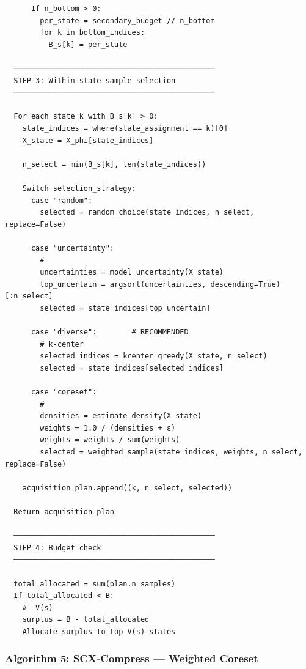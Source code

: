 \documentclass[
  12pt,
]{article}
\begin{document}
\begin{verbatim}
      If n_bottom > 0:
        per_state = secondary_budget // n_bottom
        for k in bottom_indices:
          B_s[k] = per_state

  ──────────────────────────────────────────────
  STEP 3: Within-state sample selection
  ──────────────────────────────────────────────

  For each state k with B_s[k] > 0:
    state_indices = where(state_assignment == k)[0]
    X_state = X_phi[state_indices]

    n_select = min(B_s[k], len(state_indices))

    Switch selection_strategy:
      case "random":
        selected = random_choice(state_indices, n_select, replace=False)

      case "uncertainty":
        # 
        uncertainties = model_uncertainty(X_state)
        top_uncertain = argsort(uncertainties, descending=True)[:n_select]
        selected = state_indices[top_uncertain]

      case "diverse":        # RECOMMENDED
        # k-center 
        selected_indices = kcenter_greedy(X_state, n_select)
        selected = state_indices[selected_indices]

      case "coreset":
        # 
        densities = estimate_density(X_state)
        weights = 1.0 / (densities + ε)
        weights = weights / sum(weights)
        selected = weighted_sample(state_indices, weights, n_select, replace=False)

    acquisition_plan.append((k, n_select, selected))

  Return acquisition_plan

  ──────────────────────────────────────────────
  STEP 4: Budget check
  ──────────────────────────────────────────────

  total_allocated = sum(plan.n_samples)
  If total_allocated < B:
    #  V(s) 
    surplus = B - total_allocated
    Allocate surplus to top V(s) states
\end{verbatim}

\subsubsection{Algorithm 5: SCX-Compress --- Weighted
Coreset}\label{algorithm-5-scx-compress-weighted-coreset}
\end{document}
